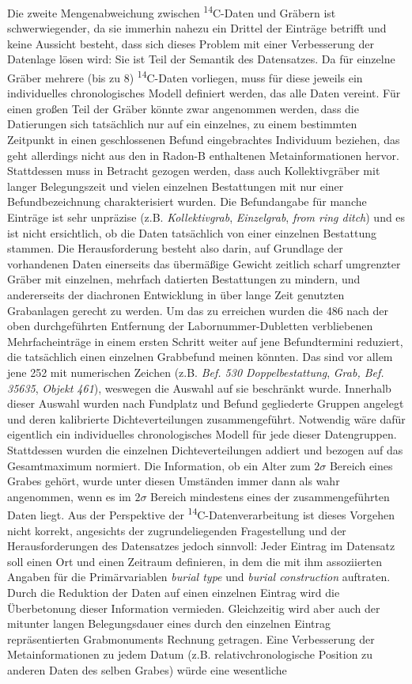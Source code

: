 \documentclass[openany,twoside,twocolumn]{book}
\begin{document}
Die zweite Mengenabweichung zwischen \textsuperscript{14}C-Daten und Gräbern ist schwerwiegender, da sie immerhin nahezu ein Drittel der Einträge betrifft und keine Aussicht besteht, dass sich dieses Problem mit einer Verbesserung der Datenlage lösen wird: Sie ist Teil der Semantik des Datensatzes. Da für einzelne Gräber mehrere (bis zu 8) \textsuperscript{14}C-Daten vorliegen, muss für diese jeweils ein individuelles chronologisches Modell definiert werden, das alle Daten vereint. Für einen großen Teil der Gräber könnte zwar angenommen werden, dass die Datierungen sich tatsächlich nur auf ein einzelnes, zu einem bestimmten Zeitpunkt in einen geschlossenen Befund eingebrachtes Individuum beziehen, das geht allerdings nicht aus den in Radon-B enthaltenen Metainformationen hervor. Stattdessen muss in Betracht gezogen werden, dass auch Kollektivgräber mit langer Belegungszeit und vielen einzelnen Bestattungen mit nur einer Befundbezeichnung charakterisiert wurden. Die Befundangabe für manche Einträge ist sehr unpräzise (z.B. \emph{Kollektivgrab}, \emph{Einzelgrab}, \emph{from ring ditch}) und es ist nicht ersichtlich, ob die Daten tatsächlich von einer einzelnen Bestattung stammen. Die Herausforderung besteht also darin, auf Grundlage der vorhandenen Daten einerseits das übermäßige Gewicht zeitlich scharf umgrenzter Gräber mit einzelnen, mehrfach datierten Bestattungen zu mindern, und andererseits der diachronen Entwicklung in über lange Zeit genutzten Grabanlagen gerecht zu werden. Um das zu erreichen wurden die 486 nach der oben durchgeführten Entfernung der Labornummer-Dubletten verbliebenen Mehrfacheinträge in einem ersten Schritt weiter auf jene Befundtermini reduziert, die tatsächlich einen einzelnen Grabbefund meinen könnten. Das sind vor allem jene 252 mit numerischen Zeichen (z.B. \emph{Bef. 530 Doppelbestattung}, \emph{Grab, Bef. 35635}, \emph{Objekt 461}), weswegen die Auswahl auf sie beschränkt wurde. Innerhalb dieser Auswahl wurden nach Fundplatz und Befund gegliederte Gruppen angelegt und deren kalibrierte Dichteverteilungen zusammengeführt. Notwendig wäre dafür eigentlich ein individuelles chronologisches Modell für jede dieser Datengruppen. Stattdessen wurden die einzelnen Dichteverteilungen addiert und bezogen auf das Gesamtmaximum normiert. Die Information, ob ein Alter zum \(2\sigma\) Bereich eines Grabes gehört, wurde unter diesen Umständen immer dann als wahr angenommen, wenn es im \(2\sigma\) Bereich mindestens eines der zusammengeführten Daten liegt. Aus der Perspektive der \textsuperscript{14}C-Datenverarbeitung ist dieses Vorgehen nicht korrekt, angesichts der zugrundeliegenden Fragestellung und der Herausforderungen des Datensatzes jedoch sinnvoll: Jeder Eintrag im Datensatz soll einen Ort und einen Zeitraum definieren, in dem die mit ihm assoziierten Angaben für die Primärvariablen \emph{burial type} und \emph{burial construction} auftraten. Durch die Reduktion der Daten auf einen einzelnen Eintrag wird die Überbetonung dieser Information vermieden. Gleichzeitig wird aber auch der mitunter langen Belegungsdauer eines durch den einzelnen Eintrag repräsentierten Grabmonuments Rechnung getragen. Eine Verbesserung der Metainformationen zu jedem Datum (z.B. relativchronologische Position zu anderen Daten des selben Grabes) würde eine wesentliche 
\end{document}
